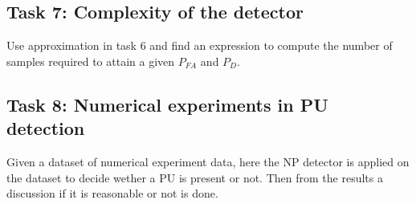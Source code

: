 \subsection{Task 7: Complexity of the detector}
Use approximation in task 6 and find an expression to compute the number of samples required to attain a given $P_{FA}$ and $P_D$.

\subsection{Task 8: Numerical experiments in PU detection}
Given a dataset of numerical experiment data, here the NP detector is applied on the dataset to decide wether a PU is present or not. Then from the results a discussion if it is reasonable or not is done.